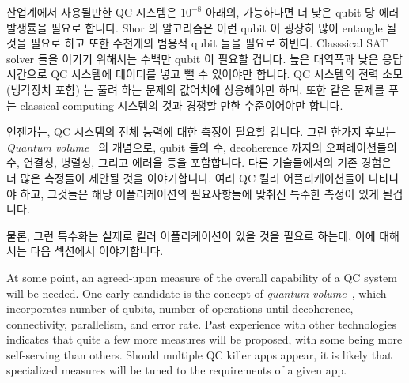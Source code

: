 산업계에서 사용될만한 QC 시스템은 $10^{-8}$ 아래의, 가능하다면 더 낮은 qubit 당
에러 발생률을 필요로 합니다.
Shor 의 알고리즘은 이런 qubit 이 굉장히 많이 entangle 될 것을 필요로 하고 또한
수천개의 범용적 qubit 들을 필요로 하빈다.
Classsical SAT solver 들을 이기기 위해서는 수백만 qubit 이 필요할 겁니다.
높은 대역폭과 낮은 응답시간으로 QC 시스템에 데이터를 넣고 뺄 수 있어야만
합니다.
QC 시스템의 전력 소모 (냉각장치 포함) 는 풀려 하는 문제의 값어치에 상응해야만
하며, 또한 같은 문제를 푸는 classical computing 시스템의 것과 경쟁할 만한
수준이어야만 합니다.

언젠가는, QC 시스템의 전체 능력에 대한 측정이 필요할 겁니다.
그런 한가지 후보는
\emph{Quantum volume}~\cite{LevSBishop2017QuantumVolume,TaliaGershon2017QuantumVolume} 의
개념으로, qubit 들의 수, decoherence 까지의 오퍼레이션들의 수, 연결성, 병렬성,
그리고 에러율 등을 포함합니다.
다른 기술들에서의 기존 경험은 더 많은 측정들이 제안될 것을 이야기합니다.
여러 QC 킬러 어플리케이션들이 나타나야 하고, 그것들은 해당 어플리케이션의
필요사항들에 맞춰진 특수한 측정이 있게 될겁니다.

물론, 그런 특수화는 실제로 킬러 어플리케이션이 있을 것을 필요로 하는데, 이에
대해서는 다음 섹션에서 이야기합니다.
\iffalse

At some point, an agreed-upon measure of the overall capability of a
QC system will be needed.
One early candidate is the concept of
\emph{quantum volume}~\cite{LevSBishop2017QuantumVolume,TaliaGershon2017QuantumVolume},
which incorporates number of qubits, number of operations until decoherence,
connectivity, parallelism, and error rate.
Past experience with other technologies indicates that quite a few more
measures will be proposed, with some being more self-serving than others.
Should multiple QC killer apps appear, it is likely that specialized
measures will be tuned to the requirements of a given app.

